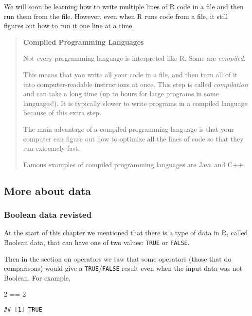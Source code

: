 \documentclass[
]{article}
\newenvironment{Shaded}{\begin{snugshade}}{\end{snugshade}}
\newcommand{\DecValTok}[1]{\textcolor[rgb]{0.00,0.00,0.81}{#1}}
\newcommand{\SpecialCharTok}[1]{\textcolor[rgb]{0.00,0.00,0.00}{#1}}
\theoremstyle{definition}
\theoremstyle{definition}
\theoremstyle{definition}
\theoremstyle{definition}
\theoremstyle{remark}
\begin{document}
We will soon be learning how to write multiple lines of R code in a file and then run them from the file. However, even when R runs code from a file, it still figures out how to run it one line at a time.

\begin{quote}
\textbf{Compiled Programming Languages}

Not every programming language is interpreted like R. Some are \emph{compiled}.

This means that you write all your code in a file, and then turn all of it into computer-readable instructions at once. This step is called \emph{compilation} and can take a long time (up to hours for large programs in some languages!). It is typically slower to write programs in a compiled language because of this extra step.

The main advantage of a compiled programming language is that your computer can figure out how to optimize all the lines of code so that they run extremely fast.

Famous examples of compiled programming languages are Java and C++.
\end{quote}

\hypertarget{more-about-data}{%
\subsection{More about data}\label{more-about-data}}

\hypertarget{boolean-data-revisted}{%
\subsubsection{Boolean data revisted}\label{boolean-data-revisted}}

At the start of this chapter we mentioned that there is a type of data in R, called Boolean data, that can have one of two values: \texttt{TRUE} or \texttt{FALSE}.

Then in the section on operators we saw that some operators (those that do comparisons) would give a \texttt{TRUE}/\texttt{FALSE} result even when the input data was not Boolean. For example,

\begin{Shaded}
\begin{Highlighting}[]
\DecValTok{2} \SpecialCharTok{==} \DecValTok{2}
\end{Highlighting}
\end{Shaded}

\begin{verbatim}
## [1] TRUE
\end{verbatim}
\end{document}
